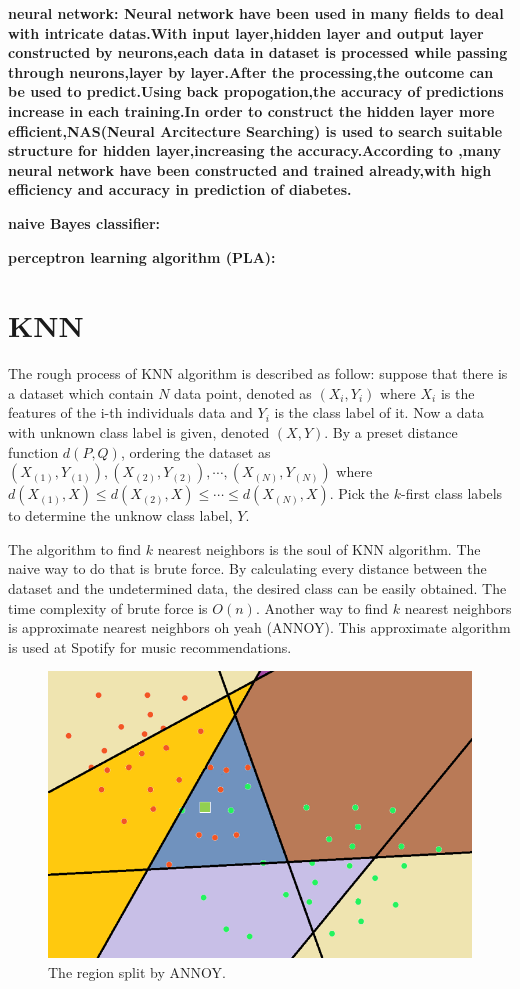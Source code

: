 \documentclass[twocolumn,10pt]{article}
\begin{document}
  \bf{neural network}: \rm{Neural} network have been used in many fields to deal with intricate datas.With input layer,hidden layer and output layer constructed by neurons,each data in dataset is processed while passing through neurons,layer by layer.After the processing,the outcome can be used to predict.Using back propogation,the accuracy of predictions increase in each training.In order to construct the hidden layer more efficient,NAS(Neural Arcitecture Searching) is used to search suitable structure for hidden layer,increasing the accuracy.According to \cite{Gadekallu2020}\cite{Beghriche2021},many neural network have been constructed and trained already,with high efficiency and accuracy in prediction of diabetes.

  \bf{naive Bayes classifier}: 

  \bf{perceptron learning algorithm (PLA)}: 

\section{KNN}
  \rm{The} rough process of KNN algorithm is described as follow: suppose that there is a dataset which contain $N$ data point, denoted as 
  $(X_i,Y_i)$ where $X_i$ is the features of the i-th individuals data and $Y_i$ is the class label of it. Now 
  a data with unknown class label is given, denoted $(X, Y)$. By a preset distance function $d(P, Q)$, ordering the dataset 
  as $(X_{(1)}, Y_{(1)}), (X_{(2)}, Y_{(2)}), \cdots, (X_{(N)}, Y_{(N)})$ where $d(X_{(1)}, X)\leq d(X_{(2)}, X)\leq\cdots\leq d(X_{(N)}, X)$. 
  Pick the $k$-first class labels to determine the unknow class label, $Y$.

  The algorithm to find $k$ nearest neighbors is the soul of KNN algorithm. The naive way to do that is brute force. By calculating every 
  distance between the dataset and the undetermined data, the desired class can be easily obtained. The time complexity of brute force is $O(n)$. 
  Another way to find $k$ nearest neighbors is approximate nearest neighbors oh yeah (ANNOY). This approximate algorithm is used at Spotify 
  for music recommendations. 
  \begin{figure}[htb]
    \centering
    \includegraphics[scale=0.5]{assets/ANNOY-split.png}
    \caption{The region split by ANNOY.}
    \label{fig:ANNOY_split}
  \end{figure}
\end{document}
